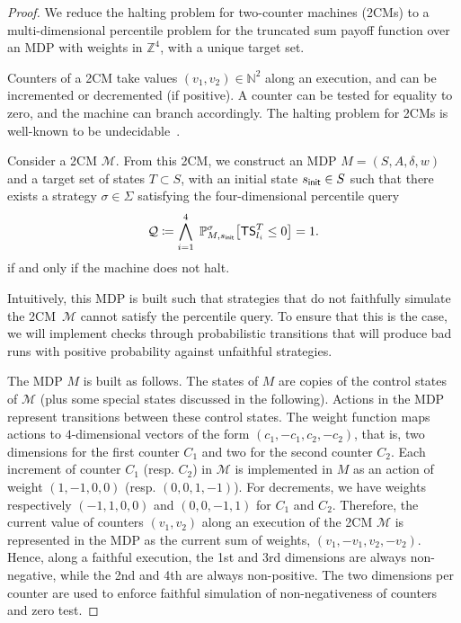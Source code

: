 \documentclass{llncs}
\newcommand{\states}{\ensuremath{S} }
\newcommand{\initState}{\ensuremath{s_{{\sf init}}} }
\newcommand{\weight}{\ensuremath{w} }
\newcommand{\markovProcess}{\ensuremath{{M} }}
\newcommand{\integ}{\ensuremath{\mathbb{Z}} }
\newcommand{\strat}{\ensuremath{\sigma} }
\newcommand*{\pr}{\mathbb{P}}
\newcommand{\truncatedTarget}{\ensuremath{T} }
\newcommand{\truncatedSum}[1]{\ensuremath{{\sf TS}^{#1}} }
\newcommand{\nat}{\ensuremath{\mathbb{N}} }
\newcommand{\twoCM}{\ensuremath{\mathcal{M}} }
\newcommand{\strats}{\ensuremath{\Sigma} }
\newcommand{\query}{\ensuremath{\mathcal{Q}} }
\begin{document}
\begin{proof}
We reduce the halting problem for two-counter machines (2CMs) to a multi-dimensional percentile problem for the truncated sum payoff function over an MDP with weights in $\integ^{4}$, with a unique target set.

Counters of a 2CM take values $(v_{1}, v_{2}) \in \nat^{2}$ along an execution, and can be incremented or decremented (if positive). A counter can be tested for equality to zero, and the machine can branch accordingly.
The halting problem for 2CMs is well-known to be undecidable~\cite{minsky1961}.

Consider a 2CM $\twoCM$. From this 2CM, we construct an MDP $\markovProcess = (\states, A, \delta, \weight)$ and a target set of states $\truncatedTarget \subset \states$, with an initial state $\initState \in \states$ such that there exists a strategy $\strat \in \strats$ satisfying the four-dimensional percentile query
\begin{equation*}
\query \coloneqq \bigwedge_{i = 1}^{4}\; \pr_{M,\initState}^\strat\big[\truncatedSum{\truncatedTarget}_{l_{i}} \leq 0\big] =
	1.
\end{equation*}
if and only if the machine does not halt.

Intuitively, this MDP is built such that strategies that do not faithfully simulate the 2CM~$\twoCM$ cannot satisfy the percentile query. To ensure that this is the case, we will implement checks through probabilistic transitions that will produce bad runs with positive probability against unfaithful strategies.

The MDP $\markovProcess$ is built as follows. The states of $\markovProcess$ are copies of the control states of $\twoCM$ (plus some special states discussed in the following). Actions in the MDP represent transitions between these control states. The weight function maps actions to $4$-dimensional vectors of the form $(c_{1}, -c_{1}, c_{2}, -c_{2})$, that is, two dimensions for the first counter $C_{1}$ and two for the second counter $C_{2}$. Each increment of counter $C_{1}$ (resp. $C_{2}$) in $\twoCM$ is implemented in $\markovProcess$ as an action of weight $(1, -1, 0, 0)$ (resp. $(0, 0, 1, -1)$). For decrements, we have weights respectively $(-1, 1, 0, 0)$ and $(0, 0, -1, 1)$ for $C_{1}$ and $C_{2}$. Therefore, the current value of counters $(v_{1}, v_{2})$ along an execution of the 2CM $\twoCM$ is represented in the MDP as the current sum of weights, $(v_{1}, -v_{1}, v_{2}, -v_{2})$. Hence, along a faithful execution, the 1st and 3rd dimensions are always non-negative, while the 2nd and 4th are always non-positive. The two dimensions per counter are used to enforce faithful simulation of non-negativeness of counters and zero test.


\end{proof}
\end{document}
